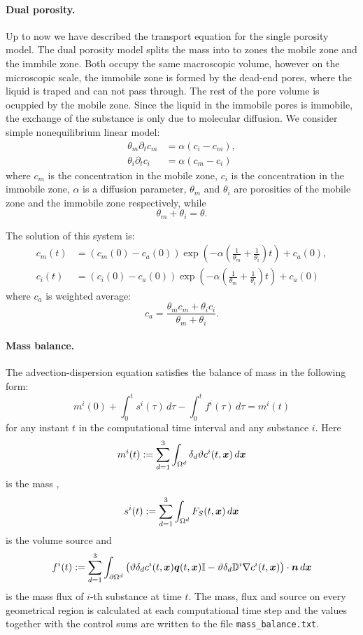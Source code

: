 \paragraph{Dual porosity.}
Up to now we have described the transport equation for the single porosity model. The dual porosity model splits the mass into to zones the mobile zone and the immbile zone. 
Both occupy the same macroscopic volume, however on the microscopic scale, the immobile zone is formed by the dead-end pores, where the liquid is traped and can not pass through.
The rest of the pore volume is ocuppied by the mobile zone. Since the liquid in the immobile pores is immobile, the exchange of the substance is only due to molecular diffusion.
We consider simple nonequilibrium linear model:
\begin{align}
    \theta_m \partial_t c_m &= \alpha ( c_i - c_m), \\
    \theta_i \partial_t c_i &= \alpha ( c_m - c_i) 
\end{align}
where $c_m$ is the concentration in the mobile zone, $c_i$ is the concentration in the immobile zone, $\alpha$ is a diffusion parameter, $\theta_m$ and $\theta_i$ are porosities of the mobile zone and the immobile zone respectively, while 
\[
  \theta_m +\theta_i =\theta.
\]

The solution of this system is:
\begin{align}
     c_m(t) &= (c_m(0) - c_a(0)) \exp(- \alpha(\frac{1}{\theta_m} + \frac{1}{\theta_i}) t) + c_a(0), \\
     c_i(t) &= (c_i(0) - c_a(0)) \exp(- \alpha(\frac{1}{\theta_m} + \frac{1}{\theta_i}) t) + c_a(0)
\end{align}
where $c_a$ is weighted average:
\[
  c_a = \frac{\theta_m c_m + \theta_i c_i}{\theta_m + \theta_i}.
\]


\paragraph{Mass balance.}
The advection-dispersion equation satisfies the balance of mass in the following form:
$$ m^i(0) + \int_0^t s^i(\tau) \,d\tau - \int_0^t f^i(\tau) \,d\tau = m^i(t) $$
for any instant $t$ in the computational time interval and any substance $i$.
Here
$$ m^i(t) := \sum_{d=1}^3\int_{\Omega^d}\delta_d\vartheta c^i(t,\mathbf{\boldsymbol{x}})\,d\mathbf{\boldsymbol{x}} $$
is the mass ,
$$ s^i(t) := \sum_{d=1}^3\int_{\Omega^d}F_S(t,\mathbf{\boldsymbol{x}})\,d\mathbf{\boldsymbol{x}} $$
is the volume source  and
$$ f^i(t) := \sum_{d=1}^3\int_{\partial\Omega^d}\left(\vartheta\delta_d c^i(t,\mathbf{\boldsymbol{x}})\mathbf{\boldsymbol{q}}(t,\mathbf{\boldsymbol{x}}){\mathbb{I}} - \vartheta\delta_d{{\mathbb{D}}}^i\nabla c^i(t,\mathbf{\boldsymbol{x}})\right)\cdot\mathbf{\boldsymbol{n}} \,d\mathbf{\boldsymbol{x}} $$
is the mass flux  of $i$-th substance at time $t$.
The mass, flux and source on every geometrical region is calculated at each computational time step and the values together with the control sums are written to the file \texttt{mass\_balance.txt}.





